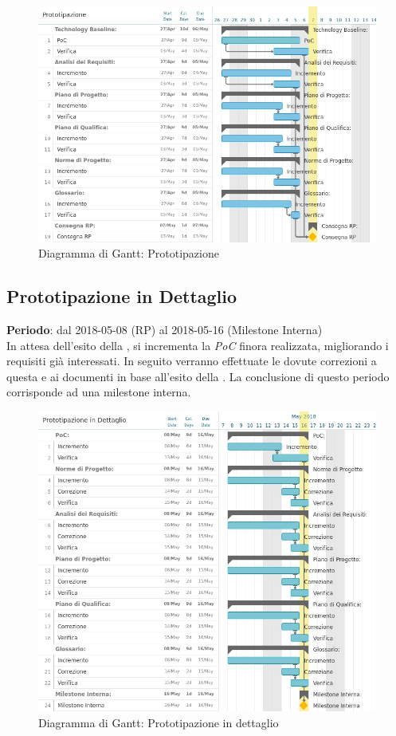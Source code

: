 \begin{figure}[h!]
	\centerline{\includegraphics[scale=0.5]{img/DiagrammiGantt/Prototipazione.jpg}}
	\caption{Diagramma di Gantt: Prototipazione}
	\label{fig:gantt_prot}
\end{figure}
\clearpage

\subsection{Prototipazione in Dettaglio}
\textbf{Periodo}: dal 2018-05-08 (RP) al 2018-05-16 (Milestone Interna)\\

In attesa dell'esito della \RP{}, si incrementa la \emph{PoC} finora realizzata, migliorando i requisiti già interessati. In seguito verranno effettuate le dovute correzioni a questa e ai documenti in base all'esito della \RP{}. La conclusione di questo periodo corrisponde ad una milestone interna.

\begin{figure}[h!]
	\centerline{\includegraphics[scale=0.5]{img/DiagrammiGantt/PrototipazioneDettaglio.jpg}}
	\caption{Diagramma di Gantt: Prototipazione in dettaglio}
	\label{fig:gantt_prot_dett}
\end{figure}
\clearpage

